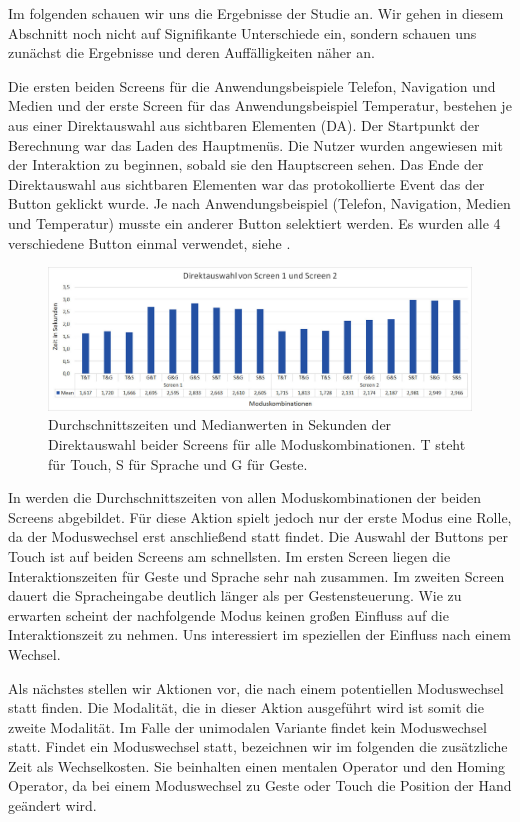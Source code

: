 Im folgenden schauen wir uns die Ergebnisse der Studie an. 
Wir gehen in diesem Abschnitt noch nicht auf Signifikante Unterschiede ein, sondern schauen uns zunächst die Ergebnisse und deren Auffälligkeiten näher an. 

Die ersten beiden Screens für die Anwendungsbeispiele Telefon, Navigation und Medien und der erste Screen für das Anwendungsbeispiel Temperatur, bestehen je aus einer Direktauswahl aus sichtbaren Elementen (DA). 
Der Startpunkt der Berechnung war das Laden des Hauptmenüs. 
Die Nutzer wurden angewiesen mit der Interaktion zu beginnen, sobald sie den Hauptscreen sehen. 
Das Ende der Direktauswahl aus sichtbaren Elementen war das protokollierte Event das der Button geklickt wurde. 
Je nach Anwendungsbeispiel (Telefon, Navigation, Medien und Temperatur) musste ein anderer Button selektiert werden. 
Es wurden alle 4 verschiedene Button einmal verwendet, siehe .
\begin{figure}[ht]
  \centering
  \includegraphics[width=1\textwidth]{img/DA_Screen12.JPG}
  \caption[Durchschnittszeiten in Sekunden der Direktauswahl]{Durchschnittszeiten und Medianwerten in Sekunden der Direktauswahl beider Screens für alle Moduskombinationen. T steht für Touch, S für Sprache und G für Geste.}
  \label{fig:DA_Screen12}
\end{figure}
In  werden die Durchschnittszeiten von allen Moduskombinationen der beiden Screens abgebildet. 
Für diese Aktion spielt jedoch nur der erste Modus eine Rolle, da der Moduswechsel erst anschließend statt findet. 
Die Auswahl der Buttons per Touch ist auf beiden Screens am schnellsten. 
Im ersten Screen liegen die Interaktionszeiten für Geste und Sprache sehr nah zusammen. 
Im zweiten Screen dauert die Spracheingabe deutlich länger als per Gestensteuerung.
Wie zu erwarten scheint der nachfolgende Modus keinen großen Einfluss auf die Interaktionszeit zu nehmen. 
Uns interessiert im speziellen der Einfluss nach einem Wechsel. 

Als nächstes stellen wir Aktionen vor, die nach einem potentiellen Moduswechsel statt finden. 
Die Modalität, die in dieser Aktion ausgeführt wird ist somit die zweite Modalität. 
Im Falle der unimodalen Variante findet kein Moduswechsel statt. 
Findet ein Moduswechsel statt, bezeichnen wir im folgenden die zusätzliche Zeit als Wechselkosten. 
Sie beinhalten einen mentalen Operator und den Homing Operator, da bei einem Moduswechsel zu Geste oder Touch die Position der Hand geändert wird.

